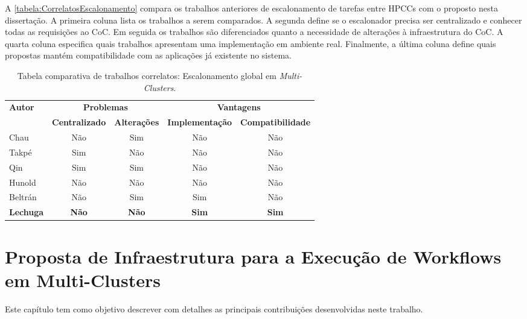 \documentclass[12pt]{report} %
\begin{document}
	A \autoref{tabela:CorrelatosEscalonamento} compara os trabalhos anteriores de escalonamento de tarefas entre HPCCs com o proposto nesta dissertação.
	A primeira coluna lista os trabalhos a serem comparados.
	A segunda define se o escalonador precisa ser centralizado e conhecer todas as requisições ao CoC.
	Em seguida os trabalhos são diferenciados quanto a necessidade de alterações à infraestrutura do CoC.
	A quarta coluna especifica quais trabalhos apresentam uma implementação em ambiente real.
	Finalmente, a última coluna define quais propostas mantém compatibilidade com as aplicações já existente no sistema.

	\begin{table}[!htb]
	    \caption{Tabela comparativa de trabalhos correlatos: Escalonamento global em \textit{Multi-Clusters}.}
	    \centering
	    \small
	    \begin{tabular}{l||c|c|c|c} %
		\hline
		\multirow{2}{2cm}{\textbf{Autor}} & \multicolumn{2}{c|}{\textbf{Problemas}} & \multicolumn{2}{c}{\textbf{Vantagens}} \\
		\cline{2-5}
		& \textbf{Centralizado} & \textbf{Alterações} & \textbf{Implementação} & \textbf{Compatibilidade} \\

		\hline
		\hline

		Chau     & Não & Sim & Não & Não \\ 
		Takpé    & Sim & Não & Não & Não \\
		Qin	 & Sim & Sim & Não & Não \\
		Hunold   & Não & Não & Não & Não \\
		Beltrán  & Não & Sim & Sim & Não \\
		\textbf{Lechuga} & \textbf{Não} & \textbf{Não} & \textbf{Sim} & \textbf{Sim} \\ 

		\hline
	    \end{tabular}
	    \label{tabela:CorrelatosEscalonamento}
	\end{table}

\chapter{Proposta de Infraestrutura para a Execução de Workflows em Multi-Clusters}
\label{chap:Desenvolvimento}
    Este capítulo tem como objetivo descrever com detalhes as principais contribuições desenvolvidas neste trabalho.
    
\end{document}
